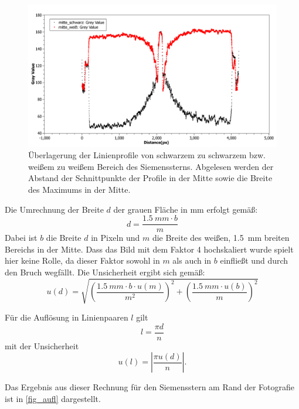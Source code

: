 \documentclass[
	a4paper,
	12pt,
	pagesize,
	ngerman
]{scrartcl}
\begin{document}
	\begin{figure}[H]  
		\includegraphics[width=1\textwidth]{fig_Einzellinse_Linienprofil}%
		\centering
		\caption{
			Überlagerung der Linienprofile von schwarzem zu schwarzem bzw. weißem zu weißem Bereich des Siemenssterns.
			Abgelesen werden der Abstand der Schnittpunkte der Profile in der Mitte sowie die Breite des Maximums in der Mitte.
		}
		\label{fig_einzel_linie}
		\centering
	\end{figure}
	
	Die Umrechnung der Breite $d$ der grauen Fläche in \si{mm} erfolgt gemäß:
	\begin{equation}
		d = \frac{\SI{1,5}{mm} \cdot b}{m}
	\end{equation}
	Dabei ist $b$ die Breite $d$ in Pixeln und $m$ die Breite des weißen, \SI{1,5}{mm} breiten Bereichs in der Mitte.
	Dass das Bild mit dem Faktor 4 hochskaliert wurde spielt hier keine Rolle, da dieser Faktor sowohl in $m$ als auch in $b$ einfließt und durch den Bruch wegfällt.
	Die Unsicherheit ergibt sich gemäß:
	\begin{equation}
		u(d)=\sqrt{\left(\frac{\SI{1,5}{mm} \cdot b \cdot u(m)}{m^2}\right)^2+\left(\frac{\SI{1,5}{mm} \cdot u(b)}{m}\right)^2}
	\end{equation}
	
	Für die Auflösung in Linienpaaren $l$ gilt
	\begin{equation}
		l=\frac{\pi d}{n}
	\end{equation}
	mit der Unsicherheit
	\begin{equation}
		u(l)=\left|\frac{\pi u(d)}{n}\right|. %
	\end{equation}
	
	Das Ergebnis aus dieser Rechnung für den Siemensstern am Rand der Fotografie ist in \cref{fig_aufl} dargestellt.
	
\end{document}
